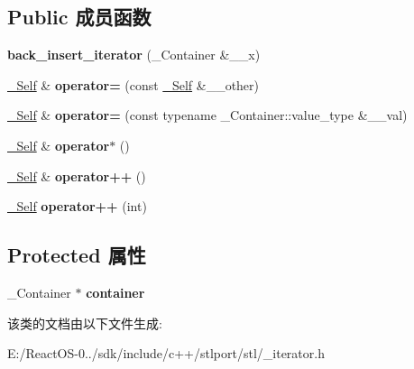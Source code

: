\subsection*{Public 成员函数}
\begin{DoxyCompactItemize}
\item 
\mbox{\label{classback__insert__iterator_a5b935e77b2f83f5b7042c611892449b6}} 
{\bfseries back\+\_\+insert\+\_\+iterator} (\+\_\+\+Container \&\+\_\+\+\_\+x)
\item 
\mbox{\label{classback__insert__iterator_ad4f18080242d849e44ad26ccb936d2f5}} 
\hyperlink{classback__insert__iterator}{\+\_\+\+Self} \& {\bfseries operator=} (const \hyperlink{classback__insert__iterator}{\+\_\+\+Self} \&\+\_\+\+\_\+other)
\item 
\mbox{\label{classback__insert__iterator_a2ccd1e77491c05b8f9a4ae5980a3a90d}} 
\hyperlink{classback__insert__iterator}{\+\_\+\+Self} \& {\bfseries operator=} (const typename \+\_\+\+Container\+::value\+\_\+type \&\+\_\+\+\_\+val)
\item 
\mbox{\label{classback__insert__iterator_aa252d28ebb5224434be8dffced526243}} 
\hyperlink{classback__insert__iterator}{\+\_\+\+Self} \& {\bfseries operator$\ast$} ()
\item 
\mbox{\label{classback__insert__iterator_ad8192d01b795d6b23324673a4f470a39}} 
\hyperlink{classback__insert__iterator}{\+\_\+\+Self} \& {\bfseries operator++} ()
\item 
\mbox{\label{classback__insert__iterator_a5d256183e92d4d858ae794bf74b21756}} 
\hyperlink{classback__insert__iterator}{\+\_\+\+Self} {\bfseries operator++} (int)
\end{DoxyCompactItemize}
\subsection*{Protected 属性}
\begin{DoxyCompactItemize}
\item 
\mbox{\label{classback__insert__iterator_a162ce75fe4e63412f6f9a0efea4af9be}} 
\+\_\+\+Container $\ast$ {\bfseries container}
\end{DoxyCompactItemize}


该类的文档由以下文件生成\+:\begin{DoxyCompactItemize}
\item 
E\+:/\+React\+O\+S-\/0../sdk/include/c++/stlport/stl/\+\_\+iterator.\+h\end{DoxyCompactItemize}
